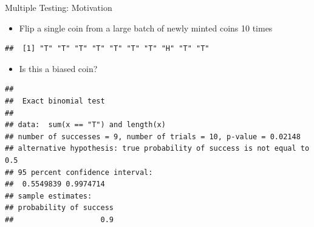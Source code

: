 \documentclass[xcolor=x11names,compress]{beamer}\usepackage[]{graphicx}\usepackage[]{color}
\makeatletter
\newenvironment{kframe}{%
 \def\at@end@of@kframe{}%
 \ifinner\ifhmode%
  \def\at@end@of@kframe{\end{minipage}}%
  \begin{minipage}{\columnwidth}%
 \fi\fi%
 \def\FrameCommand##1{\hskip\@totalleftmargin \hskip-\fboxsep
 \colorbox{shadecolor}{##1}\hskip-\fboxsep
     \hskip-\linewidth \hskip-\@totalleftmargin \hskip\columnwidth}%
 \MakeFramed {\advance\hsize-\width
   \@totalleftmargin\z@ \linewidth\hsize
   \@setminipage}}%
 {\par\unskip\endMakeFramed%
 \at@end@of@kframe}
\newenvironment{knitrout}{}{} %
\makeatother
\begin{document}
\begin{frame}[fragile]{Multiple Testing: Motivation}
  \begin{itemize}
  \item Flip a single coin from a large batch of newly minted coins 10 times
  \end{itemize}
\begin{knitrout}\tiny
{}\color{fgcolor}\begin{kframe}
\begin{verbatim}
##  [1] "T" "T" "T" "T" "T" "T" "T" "H" "T" "T"
\end{verbatim}
\end{kframe}
\end{knitrout}
\begin{itemize}
\item Is this a biased coin?
\end{itemize}
\begin{knitrout}\tiny
{}\color{fgcolor}\begin{kframe}
\begin{verbatim}
## 
## 	Exact binomial test
## 
## data:  sum(x == "T") and length(x)
## number of successes = 9, number of trials = 10, p-value = 0.02148
## alternative hypothesis: true probability of success is not equal to 0.5
## 95 percent confidence interval:
##  0.5549839 0.9974714
## sample estimates:
## probability of success 
##                    0.9
\end{verbatim}
\end{kframe}
\end{knitrout}
\end{frame}
\end{document}
